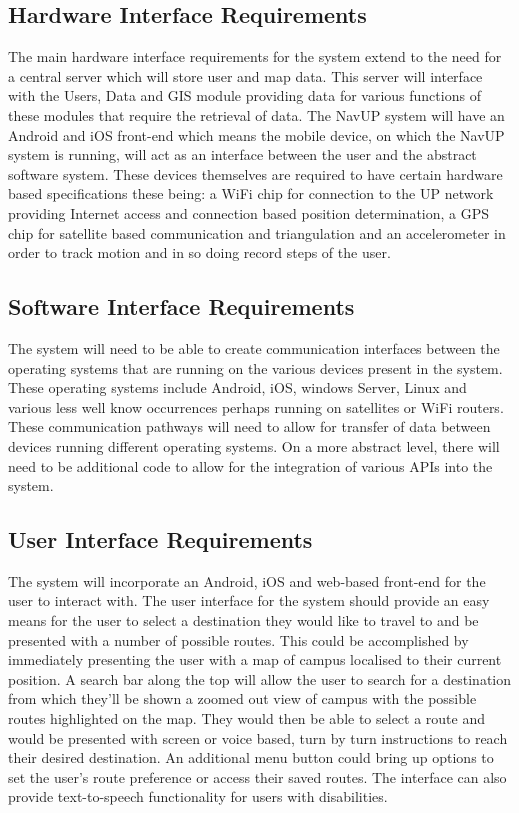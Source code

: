 \documentclass[a4paper, 12pt, one column]{article}
\begin{document}
\subsection{Hardware Interface Requirements}
The main hardware interface requirements for the system extend to the need for a central server which will store user and map data. This server will interface with the Users, Data and GIS module providing data for various functions of these modules that require the retrieval of data. The NavUP system will have an Android and iOS front-end which means the mobile device, on which the NavUP system is running, will act as an interface between the user and the abstract software system. These devices themselves are required to have certain hardware based specifications these being: a WiFi chip for connection to the UP network providing Internet access and connection based position determination, a GPS chip for satellite based communication and triangulation and an accelerometer in order to track motion and in so doing record steps of the user.  
\subsection{Software Interface Requirements}
The system will need to be able to create communication interfaces between the operating systems that are running on the various devices present in the system. These operating systems include Android, iOS, windows Server, Linux and various less well know occurrences perhaps running on satellites or WiFi routers. These communication pathways will need to allow for transfer of data between devices running different operating systems. On a more abstract level, there will need to be additional code to allow for the integration of various APIs into the system. 
\subsection{User Interface Requirements}
The system will incorporate an Android, iOS and web-based front-end for the user to interact with. The user interface for the system should provide an easy means for the user to select a destination they would like to travel to and be presented with a number of possible routes. This could be accomplished by immediately presenting the user with a map of campus localised to their current position. A search bar along the top will allow the user to search for a destination from which they’ll be shown a zoomed out view of campus with the possible routes highlighted on the map. They would then be able to select a route and would be presented with screen or voice based, turn by turn instructions to reach their desired destination. An additional menu button could bring up options to set the user’s route preference or access their saved routes. The interface can also provide text-to-speech functionality for users with disabilities.
\newpage
\end{document}
